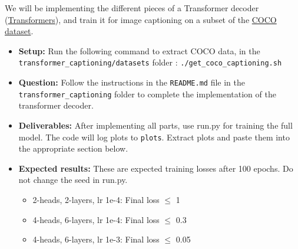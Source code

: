 \documentclass[11pt,addpoints,answers]{exam}
\numberwithin{equation}{section} %
\numberwithin{figure}{section} %
\numberwithin{table}{section} %
\begin{document}
We will be implementing the different pieces of a Transformer decoder (\href{https://arxiv.org/pdf/1706.03762.pdf}{Transformers}), and train it for image captioning on a subset of the \href{https://cocodataset.org/#home}{COCO dataset}. 
\begin{itemize}
    \item \textbf{Setup:} Run the following command to extract COCO data, in the \texttt{transformer\_captioning/datasets} folder : \texttt{./get\_coco\_captioning.sh}
\item \textbf{Question:} Follow the instructions in the \texttt{README.md} file in the \texttt{transformer\_captioning} folder to complete the implementation of the transformer decoder.
\item \textbf{Deliverables:} After implementing all parts, use run.py for training the full model. The code will log plots to \texttt{plots}. Extract plots and paste them into the appropriate section below. 

\item \textbf{Expected results:}
    These are expected training losses after 100 epochs. Do not change the seed in run.py.
    \begin{itemize}
        \item 2-heads, 2-layers, lr 1e-4: Final loss $\leq$ 1 
        \item 4-heads, 6-layers, lr 1e-4: Final loss $\leq$ 0.3 
        \item 4-heads, 6-layers, lr 1e-3: Final loss $\leq$ 0.05
    \end{itemize}
\end{itemize}
\end{document}
